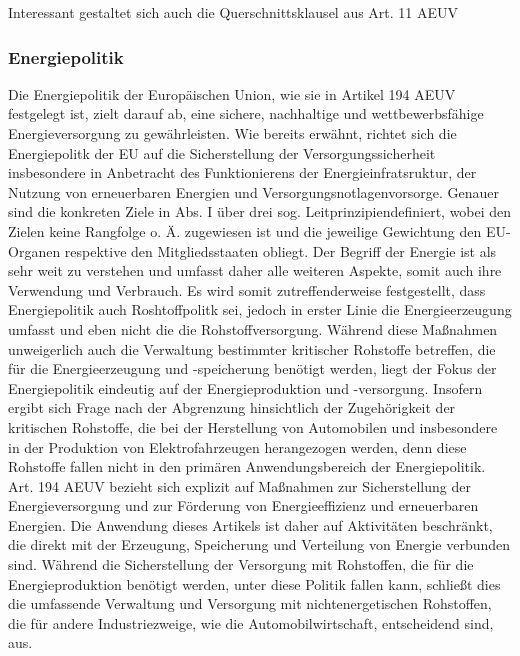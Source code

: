 \documentclass[12pt,a4paper,oneside]{book} %
\begin{document}
	Interessant gestaltet sich auch die Querschnittsklausel aus Art. 11 AEUV
	
	\subsubsection{Energiepolitik}
	Die Energiepolitik der Europäischen Union, wie sie in Artikel 194 AEUV festgelegt ist, zielt darauf ab, eine sichere, nachhaltige und wettbewerbsfähige Energieversorgung zu gewährleisten. Wie bereits erwähnt, richtet sich die Energiepolitk der EU auf die Sicherstellung der Versorgungssicherheit insbesondere in Anbetracht des Funktionierens der Energieinfratsruktur, der Nutzung von erneuerbaren Energien und Versorgungsnotlagenvorsorge.\autocite[387]{frau_rohstoffe_2025} Genauer sind die konkreten Ziele in Abs. I über drei sog. \glqq Leitprinzipien\grqq definiert, wobei den Zielen keine Rangfolge o. Ä. zugewiesen ist und die jeweilige Gewichtung den EU-Organen respektive den Mitgliedsstaaten obliegt.\autocite[Gundel § M Rn. 26 27]{dauses_handbuch_2024} 
	Der Begriff der Energie ist als sehr weit zu verstehen und umfasst daher alle weiteren Aspekte, somit auch ihre Verwendung und Verbrauch.\autocite[Hamer Art. 194 Rn 8]{von_der_groeben_europaisches_2024} 
	Es wird somit zutreffenderweise festgestellt, dass Energiepolitik auch Roshtoffpolitk sei, jedoch in erster Linie die Energieerzeugung umfasst und eben nicht die die Rohstoffversorgung. Während diese Maßnahmen unweigerlich auch die Verwaltung bestimmter kritischer Rohstoffe betreffen, die für die Energieerzeugung und -speicherung benötigt werden, liegt der Fokus der Energiepolitik eindeutig auf der Energieproduktion und -versorgung.
	Insofern ergibt sich Frage nach der Abgrenzung hinsichtlich der Zugehörigkeit der kritischen Rohstoffe, die bei der Herstellung von Automobilen und insbesondere in der Produktion von Elektrofahrzeugen herangezogen werden, denn diese Rohstoffe fallen nicht in den primären Anwendungsbereich der Energiepolitik. Art. 194 AEUV bezieht sich explizit auf Maßnahmen zur Sicherstellung der Energieversorgung und zur Förderung von Energieeffizienz und erneuerbaren Energien. Die Anwendung dieses Artikels ist daher auf Aktivitäten beschränkt, die direkt mit der Erzeugung, Speicherung und Verteilung von Energie verbunden sind. Während die Sicherstellung der Versorgung mit Rohstoffen, die für die Energieproduktion benötigt werden, unter diese Politik fallen kann, schließt dies die umfassende Verwaltung und Versorgung mit nichtenergetischen Rohstoffen, die für andere Industriezweige, wie die Automobilwirtschaft, entscheidend sind, aus.
	
\end{document}

